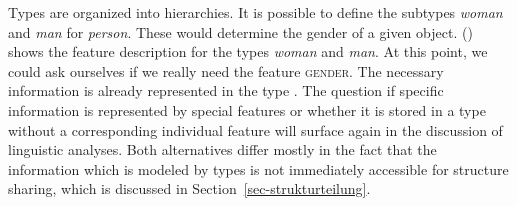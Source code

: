 Types are organized into hierarchies.
It is possible to define the subtypes  \textit{woman} and \textit{man} for  \textit{person}. These would determine the gender of a given object.
() shows the feature description for the types \textit{woman} and \emph{man}.
\ea
\label{avm-woman}
\hspace{2cm}
\z
At this point, we could ask ourselves if we really need the feature \textsc{gender}. The necessary information is already represented in the type .
The question if specific information is represented by special features or whether it is stored in a type without a corresponding individual feature will
surface again in the discussion of linguistic analyses.
Both alternatives differ mostly in the fact that the information which is modeled by types is not
immediately accessible for structure sharing, which is discussed in Section~\ref{sec-strukturteilung}.

